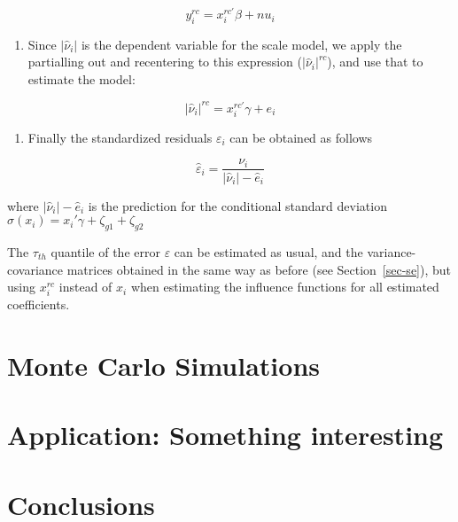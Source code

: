 \documentclass[
  letterpaper,
  DIV=11,
  numbers=noendperiod]{scrartcl}
\providecommand{\tightlist}{%
  \setlength{\itemsep}{0pt}\setlength{\parskip}{0pt}}\usepackage{longtable,booktabs,array}
\begin{document}
\[y_{i}^{rc} = x_{i}^{rc'} \beta + nu_{i}
\]

\begin{enumerate}
\def\labelenumi{\arabic{enumi}.}
\setcounter{enumi}{2}
\tightlist
\item
  Since \(|\hat \nu_i|\) is the dependent variable for the scale model,
  we apply the partialling out and recentering to this expression
  (\(|\hat \nu_i|^{rc}\)), and use that to estimate the model:
\end{enumerate}

\[|\hat\nu_{i}|^{rc} = x_{i}^{rc'} \gamma + e_{i}\]

\begin{enumerate}
\def\labelenumi{\arabic{enumi}.}
\setcounter{enumi}{3}
\tightlist
\item
  Finally the standardized residuals \(\varepsilon_i\) can be obtained
  as follows
\end{enumerate}

\[\hat{\varepsilon}_{i} = \frac{\nu_{i}}{|\hat\nu_{i}|- \hat e_{i}}\]

where \(|\hat\nu_{i}|- \hat e_{i}\) is the prediction for the
conditional standard deviation
\(\sigma(x_i)=x_{i}' \gamma + \zeta_{g1} + \zeta_{g2}\)

The \(\tau_{th}\) quantile of the error \(\varepsilon\) can be estimated
as usual, and the variance-covariance matrices obtained in the same way
as before (see Section~\ref{sec-se}), but using \(x_{i}^{rc}\) instead
of \(x_{i}\) when estimating the influence functions for all estimated
coefficients.

\hypertarget{monte-carlo-simulations}{%
\section{Monte Carlo Simulations}\label{monte-carlo-simulations}}

\hypertarget{application-something-interesting}{%
\section{\texorpdfstring{Application: \textbf{Something
interesting}}{Application: Something interesting}}\label{application-something-interesting}}

\hypertarget{conclusions}{%
\section{Conclusions}\label{conclusions}}
\end{document}
